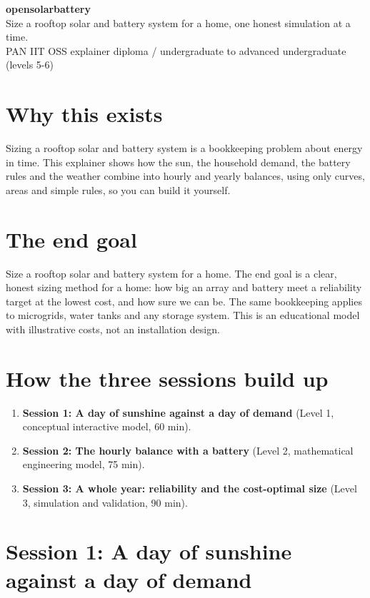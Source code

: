 \documentclass[11pt,a4paper]{article}
\begin{document}
\begin{center}{\LARGE\bfseries opensolarbattery}\\[0.4em]{\large Size a rooftop solar and battery system for a home, one honest simulation at a time.}\\[0.2em]\small PAN IIT OSS explainer \textbullet{} diploma / undergraduate to advanced undergraduate (levels 5-6)\end{center}

\section*{Why this exists}
Sizing a rooftop solar and battery system is a bookkeeping problem about energy in time. This explainer shows how the sun, the household demand, the battery rules and the weather combine into hourly and yearly balances, using only curves, areas and simple rules, so you can build it yourself.

\section*{The end goal}
Size a rooftop solar and battery system for a home. The end goal is a clear, honest sizing method for a home: how big an array and battery meet a reliability target at the lowest cost, and how sure we can be. The same bookkeeping applies to microgrids, water tanks and any storage system. This is an educational model with illustrative costs, not an installation design.

\section*{How the three sessions build up}
\begin{enumerate}[nosep]
\item \textbf{Session 1: A day of sunshine against a day of demand} (Level 1, conceptual interactive model, 60 min).
\item \textbf{Session 2: The hourly balance with a battery} (Level 2, mathematical engineering model, 75 min).
\item \textbf{Session 3: A whole year: reliability and the cost-optimal size} (Level 3, simulation and validation, 90 min).
\end{enumerate}

\section{Session 1: A day of sunshine against a day of demand}
\end{document}
